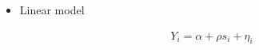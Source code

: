 \documentclass[pdftex]{beamer}
\begin{document}
 
 
 
 \begin{frame}
\begin{itemize}
\item Linear model

\begin{eqnarray*}
           Y_{i}= \alpha+ \rho s_{i}+ \eta_{i}
      \end{eqnarray*}
      \end{itemize}
\end{frame}
\end{document}
